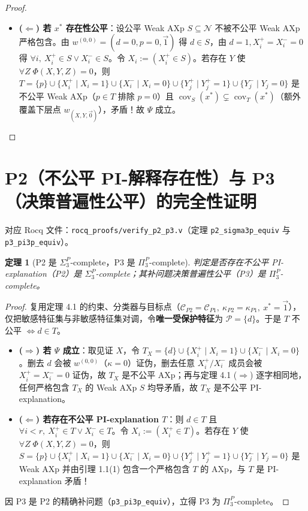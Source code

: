 \documentclass[11pt,a4paper]{article}
\newtheorem{theorem}{定理}[section]
\newcommand{\C}{\mathcal{C}}
\newcommand{\N}{\mathcal{N}}
\newcommand{\Prot}{\mathcal{P}}
\newcommand{\cov}{\operatorname{cov}}
\newcommand{\code}[1]{\texttt{\small #1}}
\begin{document}
\begin{proof}
\begin{itemize}
\begin{itemize}
  \end{itemize}
  \item \textbf{($\Leftarrow$) 若 $x^*$ 存在性公平}：设公平 Weak AXp $S \subseteq \N$ 不被不公平 Weak AXp 严格包含。由 $w^{(0,0)}=(d=0,p=0,\vec{1})$ 得 $d \in S$，由 $d=1, X_i^+=X_i^-=0$ 得 $\forall i,\ X_i^+ \in S \lor X_i^- \in S$。令 $X_i := (X_i^+ \in S)$。若存在 $Y$ 使 $\forall Z\;\Phi(X,Y,Z)=0$，则 $T = \{p\} \cup \{X_i^+ \mid X_i=1\} \cup \{X_i^- \mid X_i=0\} \cup \{Y_j^+ \mid Y_j^+=1\} \cup \{Y_j^- \mid Y_j=0\}$ 是不公平 Weak AXp（$p \in T$ 排除 $p=0$）且 $\cov_S(x^*) \subsetneq \cov_T(x^*)$（额外覆盖下层点 $w_{(X,Y,\vec{0})}$），矛盾！故 $\Psi$ 成立。
\end{itemize}
\end{proof}

\section{P2（不公平 PI-解释存在性）与 P3（决策普遍性公平）的完全性证明}
对应 Rocq 文件：\code{rocq\_proofs/verify\_p2\_p3.v}（定理 \code{p2\_sigma3p\_equiv} 与 \code{p3\_pi3p\_equiv}）。

\begin{theorem}[P2 是 $\Sigma_3^P$-complete，P3 是 $\Pi_3^P$-complete]
判定是否存在不公平 PI-explanation（P2）是 $\Sigma_3^P$-complete；其补问题决策普遍性公平（P3）是 $\Pi_3^P$-complete。
\end{theorem}
\begin{proof}
复用定理 4.1 的约束、分类器与目标点（$\C_{P2}=\C_{P1},\ \kappa_{P2}=\kappa_{P1},\ x^*=\vec{1}$），仅把敏感特征集与非敏感特征集对调，令\textbf{唯一受保护特征}为 $\Prot = \{d\}$。于是 $T$ 不公平 $\iff d \in T$。
\begin{itemize}
  \item \textbf{($\Rightarrow$) 若 $\Psi$ 成立}：取见证 $X$，令 $T_X = \{d\} \cup \{X_i^+ \mid X_i=1\} \cup \{X_i^- \mid X_i=0\}$。删去 $d$ 会被 $w^{(0,0)}$（$\kappa=0$）证伪，删去任意 $X_i^+/X_i^-$ 成员会被 $X_i^+=X_i^-=0$ 证伪，故 $T_X$ 是不公平 AXp；再与定理 4.1 ($\Rightarrow$) 逐字相同地，任何严格包含 $T_X$ 的 Weak AXp $S$ 均导矛盾，故 $T_X$ 是不公平 PI-explanation。
  \item \textbf{($\Leftarrow$) 若存在不公平 PI-explanation $T$}：则 $d \in T$ 且 $\forall i<r,\ X_i^+ \in T \lor X_i^- \in T$。令 $X_i := (X_i^+ \in T)$。若存在 $Y$ 使 $\forall Z\;\Phi(X,Y,Z)=0$，则 $S = \{p\} \cup \{X_i^+ \mid X_i=1\} \cup \{X_i^- \mid X_i=0\} \cup \{Y_j^+ \mid Y_j^+=1\} \cup \{Y_j^- \mid Y_j=0\}$ 是 Weak AXp 并由引理 1.1(1) 包含一个严格包含 $T$ 的 AXp，与 $T$ 是 PI-explanation 矛盾！
\end{itemize}
因 P3 是 P2 的精确补问题（\code{p3\_pi3p\_equiv}），立得 P3 为 $\Pi_3^P$-complete。
\end{proof}
\end{document}
